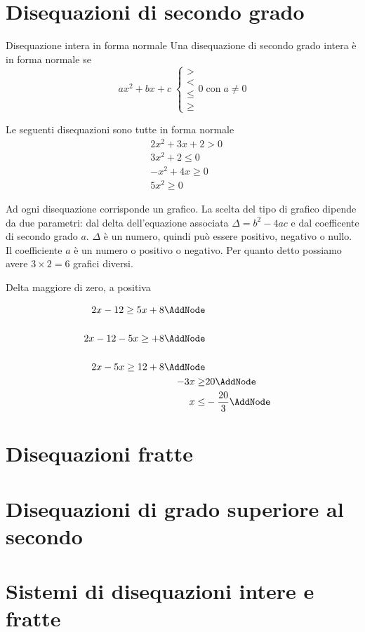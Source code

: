 \section{Disequazioni di secondo grado}
\begin{definizionet}{Disequazione intera in forma normale}{}
	Una disequazione di secondo grado intera è in forma normale se \[ax^2+bx+c\;\begin{cases}
	>\\
	<\\
	\leq\\
	\geq
	\end{cases} 0\; \text{con}\; a\neq 0\]
\end{definizionet}
\begin{osservazionet}{}{}
	Le seguenti disequazioni sono tutte in forma normale
	\begin{align*}
	&2x^2+3x+2>0\\
	&3x^2+2\leq0\\
	&-x^2+4x\geq0\\
	&5x^2\geq0
	\end{align*}
\end{osservazionet} 
Ad ogni disequazione corrisponde un grafico. La scelta del tipo di grafico dipende da due parametri: dal delta dell'equazione associata $\Delta=b^2-4ac$ e dal coefficente di secondo grado $a$. $\Delta$  è un numero, quindi può essere positivo, negativo o nullo. Il coefficiente $a$ è un numero o positivo o negativo. Per quanto detto possiamo avere $3\times 2=6$ grafici diversi.
\begin{esempiot}{Delta maggiore di zero, a positiva}{}
\begin{NodesList}[margin=4.5cm]
	\centering
	\begin{align*}
	2x-12\geq 5x+8\AddNode\\[.5cm] 
	2x-12-5x\geq+8\AddNode\\[.5cm] %
	2x-5x\geq 12+8\AddNode\\
	-3x\geq &20\AddNode\\
	x\leq&-\dfrac{20}{3}\AddNode
	\end{align*}
\end{NodesList}
\end{esempiot}
\section{Disequazioni fratte}
\section{Disequazioni di grado superiore al secondo}
\section{Sistemi di disequazioni intere e fratte}